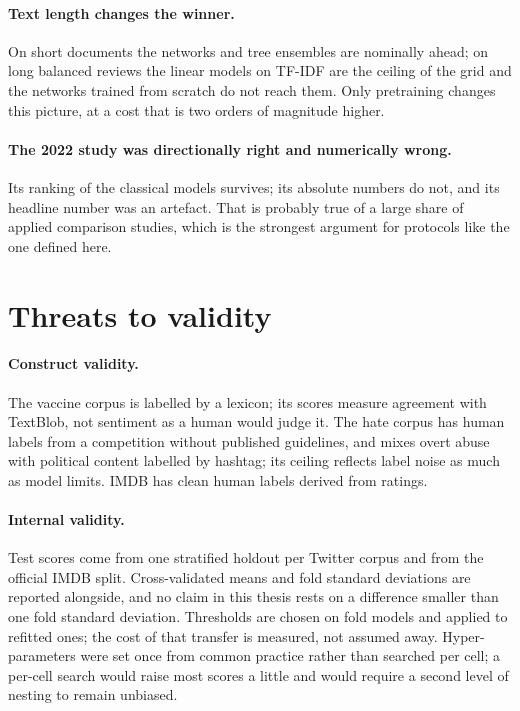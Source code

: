 \paragraph{Text length changes the winner.} On short documents the networks and tree ensembles are nominally ahead; on long balanced reviews the linear models on TF-IDF are the ceiling of the grid and the networks trained from scratch do not reach them. Only pretraining changes this picture, at a cost that is two orders of magnitude higher.

\paragraph{The 2022 study was directionally right and numerically wrong.} Its ranking of the classical models survives; its absolute numbers do not, and its headline number was an artefact. That is probably true of a large share of applied comparison studies, which is the strongest argument for protocols like the one defined here.

\section{Threats to validity}
\paragraph{Construct validity.} The vaccine corpus is labelled by a lexicon; its scores measure agreement with TextBlob, not sentiment as a human would judge it. The hate corpus has human labels from a competition without published guidelines, and mixes overt abuse with political content labelled by hashtag; its ceiling reflects label noise as much as model limits. IMDB has clean human labels derived from ratings.

\paragraph{Internal validity.} Test scores come from one stratified holdout per Twitter corpus and from the official IMDB split. Cross-validated means and fold standard deviations are reported alongside, and no claim in this thesis rests on a difference smaller than one fold standard deviation. Thresholds are chosen on fold models and applied to refitted ones; the cost of that transfer is measured, not assumed away. Hyper-parameters were set once from common practice rather than searched per cell; a per-cell search would raise most scores a little and would require a second level of nesting to remain unbiased.

